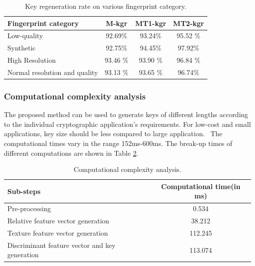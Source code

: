 \begin{table}[ht]

	\caption{Key regeneration rate on various fingerprint category.}
	\label{table:perform2}
	\begin{center}
		\begin{tabular}{|l |c |c |c |}
			\hline
			Fingerprint category          & M-kgr   & MT1-kgr & MT2-kgr \\
			[0.5ex]
			\hline
			Low-quality                   & 92.69\%  & 93.24\%  & 95.52 \% \\
			Synthetic                     & 92.75\%  & 94.45\%  & 97.92\%  \\
			High Resolution               & 93.46 \% & 93.90 \% & 96.84 \% \\
			Normal resolution and quality & 93.13 \% & 93.65 \% & 96.74\%  \\
			\hline
		\end{tabular}%
	\end{center}

\end{table}
\subsubsection{Computational complexity analysis }
The proposed method can be used to generate keys of different lengths according
to the individual cryptographic application's requirements. 
For low-cost and small
applications, key size should be less compared to large application.
~The
computational times vary in the range 152ms-600ms. 
The break-up times of
different computations are shown in Table \ref{table:timecomplexity}.
\begin{table}[!ht]
	\caption{Computational complexity analysis.}
	\label{table:timecomplexity}
	\begin{center}
		\begin{tabular}{|l |c |} \hline
			Sub-steps                                      & Computational
			time(in ms)                                                    \\
			\hline
			Pre-processing                                 & 0.534         \\
			Relative feature vector generation             & 38.212        \\
			Texture feature vector generation              & 112.245       \\
			Discriminant feature vector and key generation & 113.074       \\
			\hline
		\end{tabular}
	\end{center}
\end{table}

